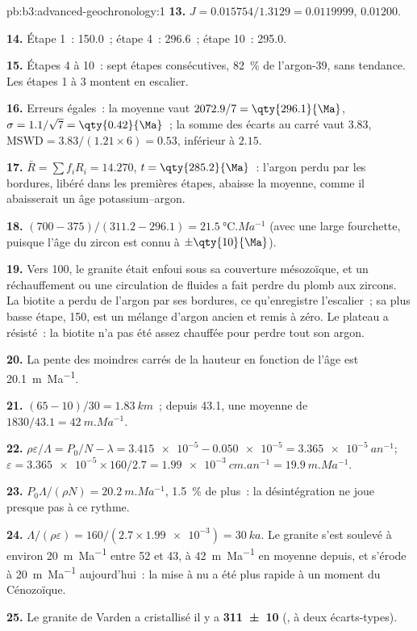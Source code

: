 \begin{solution}{pb:b3:advanced-geochronology:1}
\textbf{13.} $J = 0.015754/1.3129 = 0.0119999$, $0.01200$.

\textbf{14.} Étape 1~: \qty{150.0}{\Ma}~; étape 4~: \qty{296.6}{\Ma}~; étape 10~:
\qty{295.0}{\Ma}.

\textbf{15.} Étapes 4 à 10~: sept étapes consécutives, \qty{82}{\percent} de
l'argon-39, sans tendance. Les étapes 1 à 3 montent en escalier.

\textbf{16.} Erreurs égales~: la moyenne vaut $2072.9/7 = \qty{296.1}{\Ma}$, $\sigma =
1.1/\sqrt7 = \qty{0.42}{\Ma}$~; la somme des écarts au carré vaut $3.83$,
$\mathrm{MSWD} = 3.83/(1.21\times6) = 0.53$, inférieur à $2.15$.

\textbf{17.} $\bar R = \sum f_iR_i = 14.270$, $t = \qty{285.2}{\Ma}$~: l'argon
perdu par les bordures, libéré dans les premières étapes, abaisse la moyenne, comme
il abaisserait un âge potassium--argon.

\textbf{18.} $(700 - 375)/(311.2 - 296.1) = \qty{21.5}{\celsius.Ma^{-1}}$
(avec une large fourchette, puisque l'âge du zircon est connu à $\pm\qty{10}{\Ma}$).

\textbf{19.} Vers \qty{100}{\Ma}, le granite était enfoui sous sa couverture
mésozoïque, et un réchauffement ou une circulation de fluides a fait perdre du plomb aux zircons.
La biotite a perdu de l'argon par ses bordures, ce qu'enregistre l'escalier~; sa
plus basse étape, \qty{150}{\Ma}, est un mélange d'argon ancien et remis à zéro. Le plateau
a résisté~: la biotite n'a pas été assez chauffée pour perdre tout son argon.

\textbf{20.} La pente des moindres carrés de la hauteur en fonction de l'âge est
\qty{20.1}{m.Ma^{-1}}.

\textbf{21.} $(65 - 10)/30 = \qty{1.83}{km}$~; depuis \qty{43.1}{\Ma}, une moyenne de
$1830/43.1 = \qty{42}{m.Ma^{-1}}$.

\textbf{22.} $\rho\varepsilon/\Lambda = P_0/N - \lambda = \num{3.415e-5} -
\num{0.050e-5} = \qty{3.365e-5}{an^{-1}}$; $\varepsilon = \num{3.365e-5}\times
160/2.7 = \qty{1.99e-3}{cm.an^{-1}} = \qty{19.9}{m.Ma^{-1}}$.

\textbf{23.} $P_0\Lambda/(\rho N) = \qty{20.2}{m.Ma^{-1}}$, \qty{1.5}{\percent}
de plus~: la désintégration ne joue presque pas à ce rythme.

\textbf{24.} $\Lambda/(\rho\varepsilon) = 160/(2.7\times\num{1.99e-3}) =
\qty{30}{ka}$. Le granite s'est soulevé à environ \qty{20}{m.Ma^{-1}} entre 52 et
\qty{43}{\Ma}, à \qty{42}{m.Ma^{-1}} en moyenne depuis, et s'érode à
\qty{20}{m.Ma^{-1}} aujourd'hui~: la mise à nu a été plus rapide à un moment
du Cénozoïque.

\textbf{25.} Le granite de Varden a cristallisé
il y a \textbf{\qty[text-series-to-math=true, separate-uncertainty=true]{311 \pm 10}{\Ma}} (,
à deux écarts-types).
\end{solution}
